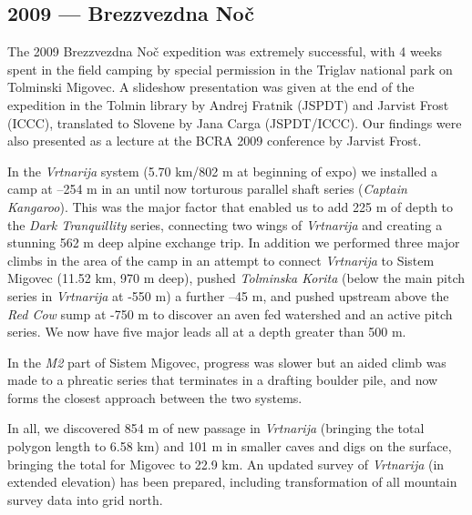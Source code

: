\begin{tcolorbox}
\chapter{2009 --- Brezzvezdna Noč}

The 2009 Brezzvezdna Noč expedition was extremely successful, with 4
weeks spent in the field camping by special permission in the Triglav
national park on Tolminski Migovec. A slideshow presentation was given
at the end of the expedition in the Tolmin library by Andrej Fratnik
(JSPDT) and Jarvist Frost (ICCC), translated to Slovene by Jana Carga
(JSPDT/ICCC). Our findings were also presented as a lecture at the BCRA
2009 conference by Jarvist Frost.

In the \emph{Vrtnarija} system (5.70 km/802 m at beginning of expo) we
installed a camp at --254 m in an until now torturous parallel shaft
series (\emph{Captain Kangaroo}). This was the major factor that enabled
us to add 225 m of depth to the \emph{Dark Tranquillity} series,
connecting two wings of \emph{Vrtnarija} and creating a stunning 562 m
deep alpine exchange trip. In addition we performed three major climbs
in the area of the camp in an attempt to connect \emph{Vrtnarija} to
Sistem Migovec (11.52 km, 970 m deep), pushed \emph{Tolminska Korita}
(below the main pitch series in \emph{Vrtnarija} at -550 m) a further
--45 m, and pushed upstream above the \emph{Red Cow} sump at -750 m to
discover an aven fed watershed and an active pitch series. We now have
five major leads all at a depth greater than 500 m.

In the \emph{M2} part of Sistem Migovec, progress was slower but an
aided climb was made to a phreatic series that terminates in a drafting
boulder pile, and now forms the closest approach between the two
systems.

In all, we discovered 854 m of new passage in \emph{Vrtnarija} (bringing
the total polygon length to 6.58 km) and 101 m in smaller caves and digs
on the surface, bringing the total for Migovec to 22.9 km. An updated
survey of \emph{Vrtnarija} (in extended elevation) has been prepared,
including transformation of all mountain survey data into grid north.

\end{tcolorbox}
